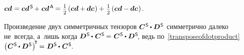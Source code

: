\begin{otherlanguage}{russian}

\noindent
{}
${\bm{c}\bm{d} \hspace{.1ex} = \bm{c}\bm{d}^{\mathsf{\hspace{.25ex}S}} \hspace{-0.2ex} + \hspace{.1ex} \bm{c}\bm{d}^{\mathsf{\hspace{.25ex}A}} \hspace{-0.16ex} = \hspace{.1ex}
\smalldisplaystyleonehalf \hspace{-0.1ex} \left( \bm{c}\bm{d} + \hspace{-0.1ex} \bm{d}\bm{c} \hspace{.1ex} \right)
+ \hspace{.16ex} \smalldisplaystyleonehalf \hspace{-0.1ex} \left( \bm{c} \bm{d} - \hspace{-0.1ex} \bm{d} \bm{c} \hspace{.1ex} \right)}$.

Произведение двух симметричных тензоров
${\bm{C}^{\mathsf{\hspace{.1ex}S}} \hspace{-0.1ex}\dotp \bm{D}^{\mathsf{\hspace{.1ex}S}}}$
симметрично далеко не~всегда,
а~лишь когда
${\bm{D}^{\mathsf{\hspace{.1ex}S}} \hspace{-0.1ex}\dotp\hspace{.12ex} \bm{C}^{\mathsf{\hspace{.1ex}S}} \hspace{-0.2ex}=\hspace{.1ex} \bm{C}^{\mathsf{\hspace{.1ex}S}} \hspace{-0.1ex}\dotp \bm{D}^{\mathsf{\hspace{.1ex}S}}\hspace{-0.4ex}}$,
ведь по~\eqref{transposeofdotproduct} ${\left(\hspace{.08ex} \bm{C}^{\mathsf{\hspace{.1ex}S}} \hspace{-0.1ex}\dotp \bm{D}^{\mathsf{\hspace{.1ex}S}} \hspace{.1ex}\right)^{\hspace{-0.32ex}\T} \hspace{-0.16ex} = \hspace{.1ex} \bm{D}^{\mathsf{\hspace{.1ex}S}} \hspace{-0.1ex}\dotp\hspace{.12ex} \bm{C}^{\mathsf{\hspace{.1ex}S}} \hspace{-0.4ex}}$.




\end{otherlanguage}
